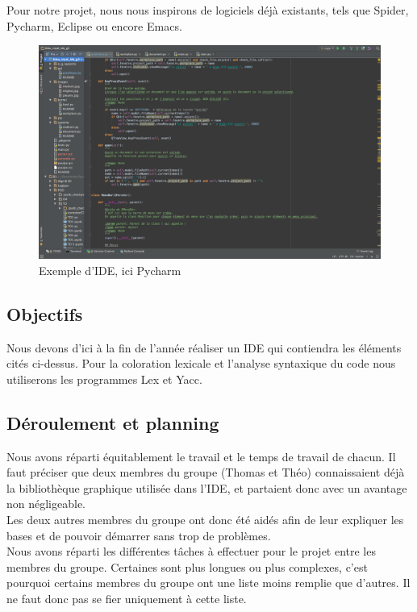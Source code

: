 \documentclass[a4paper,12pt]{article}
\begin{document}
	Pour notre projet, nous nous inspirons de logiciels déjà existants, tels que Spider, Pycharm, Eclipse ou encore Emacs.
	\begin{figure}[h!]
		\begin{center}
			\includegraphics[scale=0.3]{images/pycharm}
			\caption{Exemple d'IDE, ici Pycharm}
		\end{center}
	\end{figure}
	
	\subsection{Objectifs}
	
	Nous devons d'ici à la fin de l'année réaliser un IDE qui contiendra les éléments cités ci-dessus. Pour la coloration lexicale et l'analyse syntaxique du code nous utiliserons les programmes Lex et Yacc.
	
	\subsection{Déroulement et planning}
	
	Nous avons réparti équitablement le travail et le temps de travail de chacun. Il faut préciser que deux membres du groupe (Thomas et Théo) connaissaient déjà la bibliothèque graphique utilisée dans l'IDE, et partaient donc avec un avantage non négligeable. \\
	Les deux autres membres du groupe ont donc été aidés afin de leur expliquer les bases et de pouvoir démarrer sans trop de problèmes.\\
	
	Nous avons réparti les différentes tâches à effectuer pour le projet entre les membres du groupe. Certaines sont plus longues ou plus complexes, c'est pourquoi certains membres du groupe ont une liste moins remplie que d'autres. Il ne faut donc pas se fier uniquement à cette liste.\\
	
\end{document}
